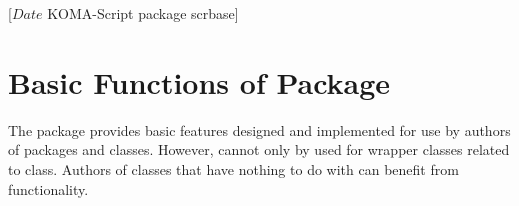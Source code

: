 %
%
%
%
%
%
%
%
% 
%
%
%
%

                 [$Date$
                  KOMA-Script package scrbase]


\chapter{Basic Functions of Package }

%

The package  provides basic features designed and implemented
for use by authors of packages and classes. However,  cannot
only by used for wrapper classes related to \KOMAScript{} class. Authors of
classes that have nothing to do with \KOMAScript{} can benefit from
 functionality.

